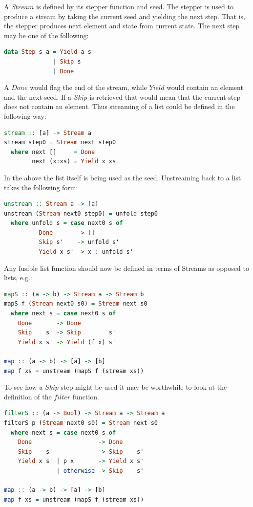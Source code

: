 \documentclass[preamble.tex]{subfiles}
\begin{document}
A $Stream$ is defined by its stepper function and seed. The stepper is used to produce a stream by taking the current seed and yielding the next step. That is, the stepper produces next element and state from current state. The next step may be one of the following:

\begin{lstlisting}[basicstyle={\ttfamily},language=Haskell]
data Step s a = Yield a s
              | Skip s
              | Done
\end{lstlisting}


A $Done$ would flag the end of the stream, while $Yield$ would contain an element and the next seed. If a $Skip$ is retrieved that would mean that the current step does not contain an element. Thus streaming of a list could be defined in the following way:

\begin{lstlisting}[basicstyle={\ttfamily},language=Haskell]
stream :: [a] -> Stream a
stream step0 = Stream next step0
  where next []     = Done
        next (x:xs) = Yield x xs
\end{lstlisting}


In the above the list itself is being used as the seed. Unstreaming back to a list takes the following form:

\begin{lstlisting}[basicstyle={\ttfamily},language=Haskell]
unstream :: Stream a -> [a]
unstream (Stream next0 step0) = unfold step0
  where unfold s = case next0 s of
          Done       -> []
          Skip s'    -> unfold s'
          Yield x s' -> x : unfold s'
\end{lstlisting}


Any fusible list function should now be defined in terms of Streams as opposed to lists, e.g.:

\begin{lstlisting}[basicstyle={\ttfamily},language=Haskell]
mapS :: (a -> b) -> Stream a -> Stream b
mapS f (Stream next0 s0) = Stream next s0
  where next s = case next0 s of
    Done       -> Done
    Skip    s' -> Skip        s'
    Yield x s' -> Yield (f x) s'

map :: (a -> b) -> [a] -> [b]
map f xs = unstream (mapS f (stream xs))
\end{lstlisting}


To see how a $Skip$ step might be used it may be worthwhile to look at the definition of the $filter$ function.

\begin{lstlisting}[basicstyle={\ttfamily},language=Haskell]
filterS :: (a -> Bool) -> Stream a -> Stream a
filterS p (Stream next0 s0) = Stream next s0
  where next s = case next0 s of
    Done                   -> Done
    Skip    s'             -> Skip    s'
    Yield x s' | p x       -> Yield x s'
               | otherwise -> Skip    s'

map :: (a -> b) -> [a] -> [b]
map f xs = unstream (mapS f (stream xs))
\end{lstlisting}
\end{document}
